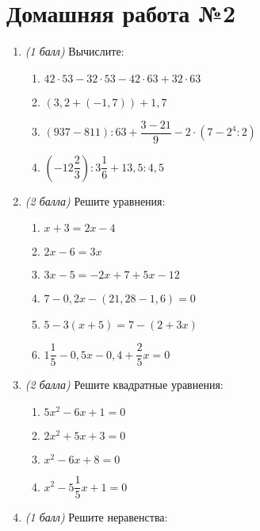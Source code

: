 \documentclass[12pt, a4paper]{article}
\begin{document}
	
	\section*{Домашняя работа №2}
	\begin{enumerate}
		\item \textit{(1 балл)} Вычислите:
		\begin{multicols}{2}
			\begin{enumerate}[label=\asbuk*)]
				\item $42 \cdot 53 - 32 \cdot 53 - 42 \cdot 63 + 32 \cdot 63$
				\item $(3,2+(-1,7))+1,7$
				\item $(937-811):63+\dfrac{3-21}{9}-2\cdot(7-2^4:2)$
				\item $\left( -12\dfrac{2}{3}\right):3\dfrac{1}{6} +13,5:4,5$
			\end{enumerate}
		\end{multicols}
		\item \textit{(2 балла)} Решите уравнения:
		\begin{multicols}{2}
			\begin{enumerate}[label=\asbuk*)]
				\item $x+3=2x-4$
				\item $2x-6=3x$
				\item $3x-5=-2x+7+5x-12$
				\item $7-0,2x-(21,28-1,6)=0$
				\item $5-3(x+5)=7-(2+3x)$
				\item $1\dfrac{1}{5}-0,5x-0,4+\dfrac{2}{5}x=0$
			\end{enumerate}
		\end{multicols}
		\item \textit{(2 балла)} Решите квадратные уравнения:
		\begin{multicols}{2}
			\begin{enumerate}[label=\asbuk*)]
				\item $5x^2-6x+1=0$
				\item $2x^2+5x+3=0$
				\item $x^2-6x+8=0$
				\item $x^2-5\dfrac{1}{5}x+1=0$
			\end{enumerate}
		\end{multicols}
		\item \textit{(1 балл)} Решите неравенства:
		\begin{multicols}{2}
			\begin{enumerate}[label=\asbuk*)]

\end{enumerate}
\end{multicols}
\end{enumerate}
\end{document}
